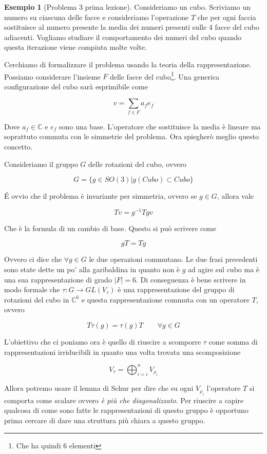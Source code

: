 \documentclass[11pt]{article}
\theoremstyle{plain}
\theoremstyle{definition}
\newtheorem{exmp}{Esempio}[section]
\theoremstyle{remark}
\newcommand{\dsum}{\displaystyle\sum}
\begin{document}
\begin{exmp}[Problema 3 prima lezione]

Consideriamo un cubo. Scriviamo un numero su ciascuna delle facce e consideriamo l'operazione $T$ che per ogni faccia sostituisce al numero presente la media dei numeri presenti sulle 4 facce del cubo adiacenti. Vogliamo studiare il comportamento dei numeri del cubo quando questa iterazione viene compiuta molte volte.


Cerchiamo di formalizzare il problema usando la teoria della rappresentazione. Possiamo considerare l'insieme $F$ delle facce del cubo\footnote{Che ha quindi 6 elementi}. Una generica configurazione del cubo sarà esprimibile come 

\[ v = \dsum_{f \in F} a_f e_f \]

Dove $a_f \in \mathbb{C}$ e $e_f$ sono una base. L'operatore che sostituisce la media è lineare ma soprattuto commuta con le simmetrie del problema. Ora spiegherò meglio questo concetto.

Consideriamo il gruppo $G$ delle rotazioni del cubo, ovvero 

\[G = \{ g \in SO(3) | g(Cubo) \subset Cubo \} \]

\'E ovvio che il problema è invariante per simmetria, ovvero se $g \in G$, allora vale

\[ T v = g^{-1}T g v \]

Che è la formula di un cambio di base. Questo si può scrivere come 

\[gT = Tg \]

Ovvero ci dice che $\forall g \in G$ le due operazioni commutano. Le due frasi precedenti sono state dette un po' alla garibaldina in quanto non è $g$ ad agire sul cubo ma è una sua rappresentazione di grado $|F| = 6$. Di conseguenza è bene scrivere in modo formale che $\tau: G \to GL(V_\tau)$ è una rappresentazione del gruppo di rotazioni del cubo in $\mathbb{C}^6$ e questa rappresentazione commuta con un operatore $T$, ovvero

\[T\tau(g) = \tau(g) T \qquad \forall g \in G  \]


L'obiettivo che ci poniamo ora è quello di riuscire a scomporre $\tau$ come somma di rappresentazioni irriducibili in quanto una volta trovata una scomposizione 

\[ V_\tau = \bigoplus_{i = i}^n V_{\rho_i} \] 

Allora potremo usare il lemma di Schur per dire che su ogni $V_{\rho_i}$ l'operatore $T$ si comporta come scalare ovvero \emph{è più che diagonalizzato}. Per riuscire a capire qualcosa di come sono fatte le rappresentazioni di questo gruppo è opportuno prima cercare di dare una struttura più chiara a questo gruppo.


\end{exmp}
\end{document}
